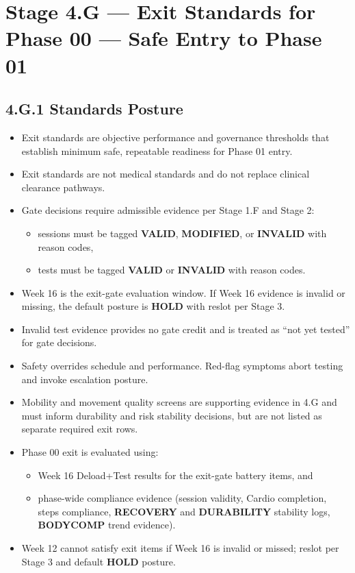 \documentclass[10pt]{article}
\begin{document}
\section*{Stage 4.G — Exit Standards for Phase 00 — Safe Entry to Phase 01}
{}

\subsection*{4.G.1 Standards Posture}
{}

\begin{itemize}
\item Exit standards are objective performance and governance thresholds that establish minimum safe, repeatable readiness for Phase 01 entry.
\item Exit standards are not medical standards and do not replace clinical clearance pathways.
\item Gate decisions require admissible evidence per Stage 1.F and Stage 2:
  \begin{itemize}
  \item sessions must be tagged \textbf{VALID}, \textbf{MODIFIED}, or \textbf{INVALID} with reason codes,
  \item tests must be tagged \textbf{VALID} or \textbf{INVALID} with reason codes.
  \end{itemize}
\item Week 16 is the exit-gate evaluation window. If Week 16 evidence is invalid or missing, the default posture is \textbf{HOLD} with reslot per Stage 3.
\item Invalid test evidence provides no gate credit and is treated as “not yet tested” for gate decisions.
\item Safety overrides schedule and performance. Red-flag symptoms abort testing and invoke escalation posture.
\item Mobility and movement quality screens are supporting evidence in 4.G and must inform durability and risk stability decisions, but are not listed as separate required exit rows.
\item Phase 00 exit is evaluated using:
  \begin{itemize}
  \item Week 16 Deload+Test results for the exit-gate battery items, and
  \item phase-wide compliance evidence (session validity, Cardio completion, steps compliance, \textbf{RECOVERY} and \textbf{DURABILITY} stability logs, \textbf{BODYCOMP} trend evidence).
  \end{itemize}
\item Week 12 cannot satisfy exit items if Week 16 is invalid or missed; reslot per Stage 3 and default \textbf{HOLD} posture.
\end{itemize}
\end{document}
